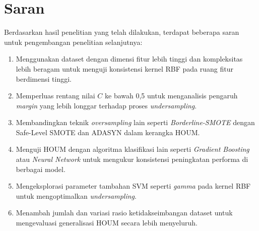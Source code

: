 \section{Saran} \label{V.Saran}
Berdasarkan hasil penelitian yang telah dilakukan, terdapat beberapa saran untuk pengembangan penelitian selanjutnya:
\begin{enumerate}
    \item Menggunakan dataset dengan dimensi fitur lebih tinggi dan kompleksitas lebih beragam untuk menguji konsistensi kernel RBF pada ruang fitur berdimensi tinggi.
    \item Memperluas rentang nilai $C$ ke bawah 0,5 untuk menganalisis pengaruh \textit{margin} yang lebih longgar terhadap proses \textit{undersampling}.
    \item Membandingkan teknik \textit{oversampling} lain seperti \textit{Borderline-SMOTE} dengan Safe-Level SMOTE dan ADASYN dalam kerangka HOUM.
    \item Menguji HOUM dengan algoritma klasifikasi lain seperti \textit{Gradient Boosting} atau \textit{Neural Network} untuk mengukur konsistensi peningkatan performa di berbagai model.
    \item Mengeksplorasi parameter tambahan SVM seperti \textit{gamma} pada kernel RBF untuk mengoptimalkan \textit{undersampling}.
    \item Menambah jumlah dan variasi rasio ketidakseimbangan dataset untuk mengevaluasi generalisasi HOUM secara lebih menyeluruh.
\end{enumerate}
